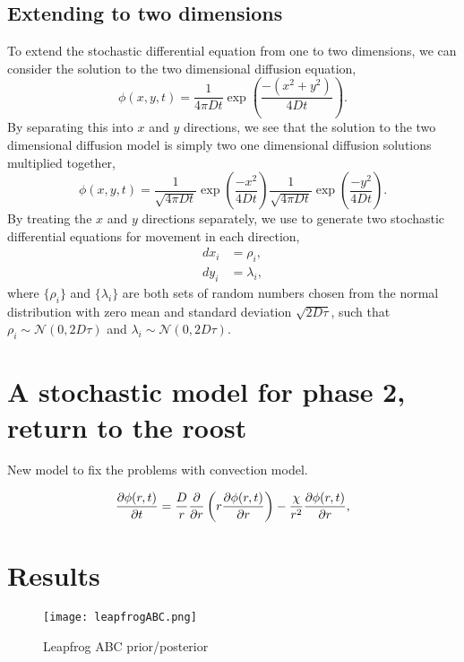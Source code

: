 \subsection{Extending to two dimensions}

To extend the stochastic differential equation from one to two dimensions, we can consider the solution to the two dimensional diffusion equation,
%
\begin{equation}
\phi(x,y,t) = \frac{1}{4\pi Dt}\exp \left(\frac{-(x^2+y^2)}{4Dt} \right) .
\label{eqn:diffusion_solution2d}
\end{equation}
%
By separating this into $x$ and $y$ directions, we see that the solution to the two dimensional diffusion model is simply two one dimensional diffusion solutions multiplied together,
\begin{equation}
\phi(x,y,t) = \frac{1}{\sqrt{4\pi Dt}}\exp \left(\frac{-x^2}{4Dt} \right) \frac{1}{\sqrt{4\pi Dt}}\exp \left(\frac{-y^2}{4Dt} \right) .
\end{equation}
%
By treating the $x$ and $y$ directions separately, we use  to generate two stochastic differential equations for movement in each direction,
\begin{align}
%
dx_i &= \rho_i, \\
dy_i &= \lambda_i,
\end{align}
%
where $\{\rho_i\}$ and $\{\lambda_i\}$ are both sets of random numbers chosen from the normal distribution with zero mean and standard deviation $\sqrt{2D\tau}$, such that $\rho_i \sim \mathcal{N}(0,2D\tau)$ and $\lambda_i \sim \mathcal{N}(0,2D\tau)$.

\section{A stochastic model for phase 2, return to the roost}
New model to fix the problems with convection model.

\begin{equation}
  \frac{\partial \phi(r,t)}{\partial t} = \frac{D}{r} \frac{\partial }{\partial r}\left(r \frac{\partial \phi(r,t)}{\partial r} \right) - \frac{\chi}{r^2} \frac{\partial \phi(r,t)}{\partial r},
  \label{eqn:convection}
\end{equation}

\section{Results}

\begin{figure} [h]
    \centering
        \texttt{[image: leapfrogABC.png]}
        \caption{Leapfrog ABC prior/posterior        }
    \label{fig:leapfrog_abc}
\end{figure}

